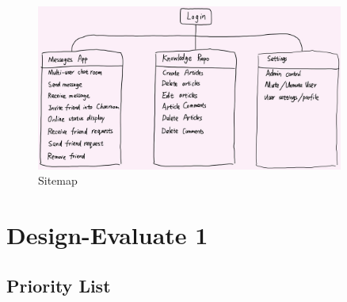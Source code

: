 \documentclass[12pt]{article}
\begin{document}
\begin{figure}[H]
    \centering
    \includegraphics[width=0.9\textwidth]{graphs/sitemap.jpg}
    \caption{Sitemap}
    \label{sitemap}
\end{figure}

\section{Design-Evaluate 1}

\subsection{Priority List}
\end{document}
